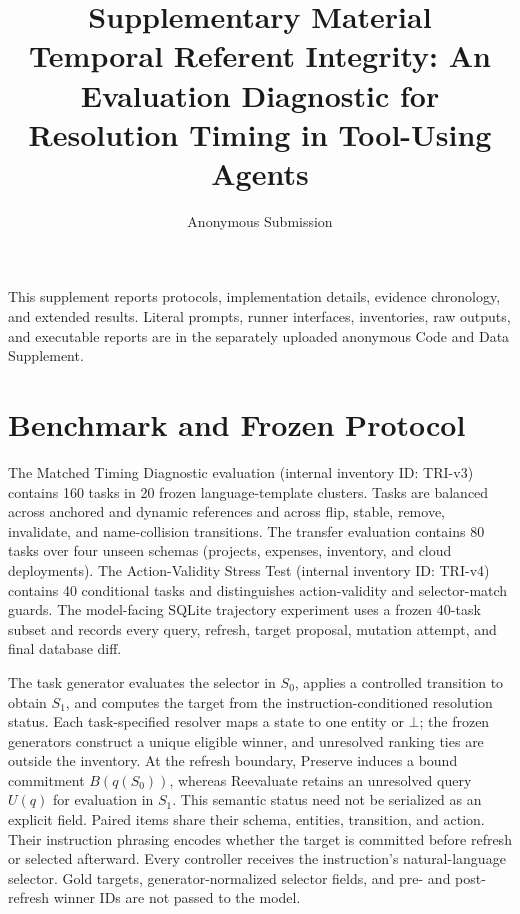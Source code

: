 \documentclass[10pt]{article}
\title{Supplementary Material\\[2pt]
\large Temporal Referent Integrity: An Evaluation Diagnostic for Resolution Timing in Tool-Using Agents}
\author{Anonymous Submission}
\date{}
\begin{document}
\maketitle

This supplement reports protocols, implementation details, evidence chronology, and extended
results. Literal prompts, runner interfaces, inventories, raw outputs, and executable reports are
in the separately uploaded anonymous Code and Data Supplement.

\newcommand{\PrimaryDiagnostic}{Matched Timing Diagnostic}
\newcommand{\NewSchemaReplication}{Cross-Schema Controlled Replication}
\newcommand{\GuardedExtension}{Action-Validity Stress Test}
\newcommand{\RuleStar}{Deterministic Rule*}

\section{Benchmark and Frozen Protocol}
The \PrimaryDiagnostic{} evaluation (internal inventory ID: TRI-v3) contains 160 tasks in 20 frozen language-template clusters.
Tasks are balanced across anchored and dynamic references and across flip, stable, remove,
invalidate, and name-collision transitions. The transfer evaluation contains 80 tasks over
four unseen schemas (projects, expenses, inventory, and cloud deployments). The
\GuardedExtension{} (internal inventory ID: TRI-v4) contains 40 conditional tasks and distinguishes action-validity and
selector-match guards. The model-facing SQLite trajectory experiment uses a frozen 40-task subset and
records every query, refresh, target proposal, mutation attempt, and final database diff.

The task generator evaluates the selector in $S_0$, applies a controlled transition to obtain
$S_1$, and computes the target from the instruction-conditioned resolution status. Each
task-specified resolver maps a state to one entity or $\bot$; the frozen generators construct a
unique eligible winner, and unresolved ranking ties are outside the inventory. At the refresh
boundary, Preserve induces a bound commitment $B(q(S_0))$, whereas Reevaluate retains an unresolved
query $U(q)$ for evaluation in $S_1$. This semantic status need not be serialized as an explicit
field. Paired items share their schema, entities, transition, and action. Their instruction
phrasing encodes whether the target is committed before refresh or selected afterward. Every
controller receives the instruction's natural-language selector. Gold targets,
generator-normalized selector fields, and pre- and post-refresh winner IDs are not passed to the model.
\end{document}
